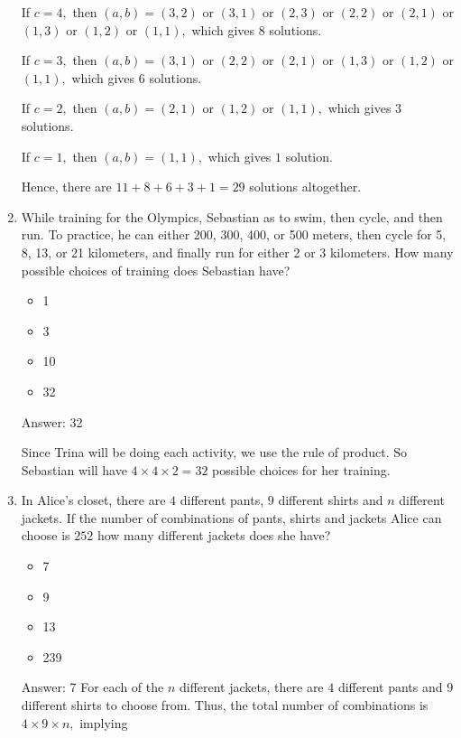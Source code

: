 \documentclass{article}
\begin{document}
\begin{enumerate}
If  \( c = 4, \) then  \((a, b)=(3,2)\) or  \((3,1)\) or  \((2,3)\) or  \((2,2)\) or  \((2, 1)\) or  \((1, 3)\) or  \((1, 2)\) or  \((1, 1),\) which gives  \(8\) solutions.

If  \( c = 3, \) then  \((a, b)=(3,1)\) or  \((2,2)\) or  \((2, 1)\) or  \((1, 3)\) or  \((1, 2)\) or  \((1, 1),\) which gives  \(6\) solutions.

If  \( c = 2, \) then  \((a, b)=(2, 1)\) or  \((1, 2)\) or  \((1, 1),\) which gives  \(3\) solutions.

If  \( c = 1, \) then  \((a, b)=(1, 1),\) which gives  \(1\) solution.

Hence, there are  \(11+8+6+3+1=29\) solutions altogether.

    \item While training for the Olympics, Sebastian as to swim, then cycle, and then run.  To practice, he can either 200, 300, 400, or 500 meters, then cycle for 5, 8, 13, or 21 kilometers, and finally run for either 2 or 3 kilometers.  How many possible choices of training does Sebastian have?
    
    \begin{itemize}
        \item 1
        \item 3
        \item 10
        \item 32
    \end{itemize}
    
    Answer:
    32
    
    Since Trina will be doing each activity, we use the rule of product. So Sebastian will have \(4 \times 4 \times 2 = 32\) possible choices for her training.
    
    \item In Alice's closet, there are $4$ different pants, $9$ different shirts and $n$ different jackets. If the number of combinations of pants, shirts and jackets Alice can choose is $252$ how many different jackets does she have?
    
    \begin{itemize}
        \item 7
        \item 9
        \item 13
        \item 239
    \end{itemize}
    
    Answer: 7
    For each of the  \(n\) different jackets, there are  \(4\) different pants and  \(9\) different shirts to choose from. Thus, the total number of combinations is  \(4 \times 9 \times n,\) implying


\end{enumerate}
\end{document}
